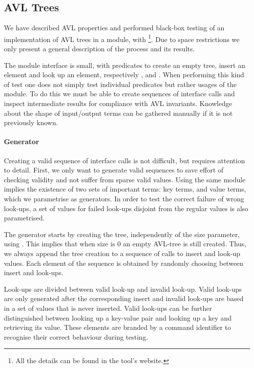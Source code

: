 
\subsection{AVL Trees}

We have described AVL properties and performed black-box testing of an
implementation of AVL trees in a \Yap{} module,  with
\plqc{}\footnote{All the details can be found in the tool's website.}.
Due to space restrictions we only present a general description of the
process and its results. 


The module interface is small, with predicates to create an empty
tree, insert an element and look up an element, respectively
,  and .
%
When performing this kind of test one does not simply test individual
predicates but rather usages of the module.
%
To do this we must be able to create sequences of interface
calls and inspect intermediate results for compliance with AVL
invariants.
%
Knowledge about the shape of input/output terms can be gathered manually
if it is not previously known.


\paragraph{\bf Generator}

Creating a valid sequence of interface calls is not difficult, but
requires attention to detail.
%
First, we only want to generate valid sequences to save effort of
checking validity and not suffer from sparse valid values.
%
Using the same module implies the existence of two sets of important
terms: key terms, and value terms, which we parametrise as generators.
%
In order to test the correct failure of wrong look-ups, a set of values
for failed look-ups disjoint from the regular values is also
parametrised.


The generator starts by creating the tree, independently of the
size parameter, using .
%
This implies that when size is 0 an empty AVL-tree is still created.
%
Thus, we always append the tree creation to a sequence of calls to
insert and look-up values.
%
Each element of the sequence is obtained by randomly choosing between
insert and look-ups.


Look-ups are divided between valid look-up and invalid look-up.
%
Valid look-ups are only generated after the corresponding insert and
invalid look-ups are based in a set of values that is never inserted.
%
Valid look-ups can be further distinguished between looking up a
key-value pair and looking up a key and retrieving its value.
%
These elements are  branded by a command identifier to recognise their
correct behaviour during testing.


